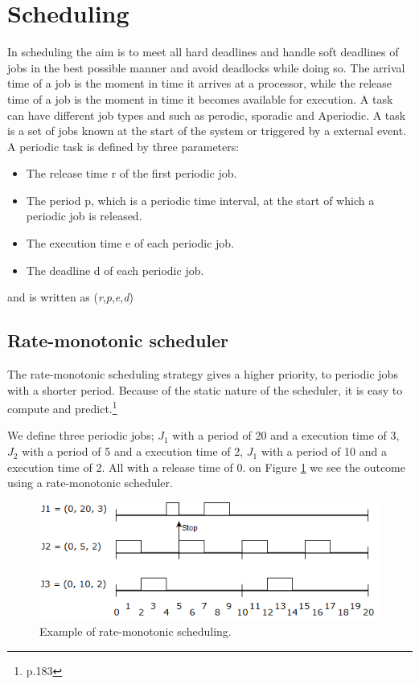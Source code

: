 \section{Scheduling} \label{sc:scheduling}
In scheduling the aim is to meet all hard deadlines and handle soft deadlines of jobs in the best possible manner and avoid deadlocks while doing so. The arrival time of a job is the moment in time it arrives at a processor, while the
release time of a job is the moment in time it becomes available for execution. A task can have different job types and such as perodic, sporadic and Aperiodic. A task is a set of jobs known at the start of the system or triggered by a external event.
A periodic task is defined by three parameters:
\begin{itemize}
	\itemsep0em
	\item The release time r of the first periodic job.
	\item The period p, which is a periodic time interval, at the start of which a periodic job is released.
	\item The execution time e of each periodic job.
	\item The deadline d of each periodic job.
\end{itemize}
and is written as (\textit{r},\textit{p},\textit{e},\textit{d})

\subsection{Rate-monotonic scheduler}
The rate-monotonic scheduling strategy gives a higher priority, to periodic jobs with a shorter period. Because of the static nature of the scheduler, it is easy to compute and predict.\footnote{\cite{Fokkink1965} p.183}

We define three periodic jobs; $J_1$ with a period of 20 and a execution time of 3, $J_2$ with a period of 5 and a execution time of 2, $J_1$ with a period of 10 and a execution time of 2. All with a release time of 0. on Figure \ref{fig:rateMonotonicExample} we see the outcome using a rate-monotonic scheduler.

\begin{figure}[h!]\label{}
	\centering
	\includegraphics[scale=0.5]{realTimeComputing/fig/rate-mono.png}
	\caption{Example of rate-monotonic scheduling.}
	\label{fig:rateMonotonicExample}
\end{figure}

